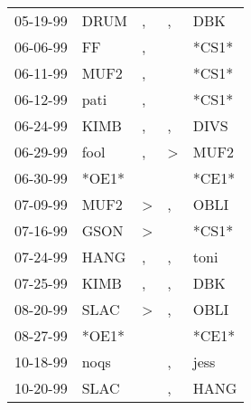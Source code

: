 \begin{supertabular}{p{0.07\textwidth}p{0.06\textwidth}p{0.02\textwidth}p{0.02\textwidth}p{0.06\textwidth}}
 05-19-99\textsuperscript{} &           DRUM\textsuperscript{} &             , &             , &   DBK\textsuperscript{} \\
 06-06-99\textsuperscript{} &             FF\textsuperscript{} &             , &               &                   *CS1* \\
 06-11-99\textsuperscript{} &           MUF2\textsuperscript{} &             , &               &                   *CS1* \\
 06-12-99\textsuperscript{} &           pati\textsuperscript{} &             , &               &                   *CS1* \\
 06-24-99\textsuperscript{} &           KIMB\textsuperscript{} &             , &             , &  DIVS\textsuperscript{} \\
 06-29-99\textsuperscript{} &           fool\textsuperscript{} &             , &  \textgreater &  MUF2\textsuperscript{} \\
 06-30-99\textsuperscript{} &                            *OE1* &               &               &                   *CE1* \\
 07-09-99\textsuperscript{} &           MUF2\textsuperscript{} &  \textgreater &             , &  OBLI\textsuperscript{} \\
 07-16-99\textsuperscript{} &           GSON\textsuperscript{} &  \textgreater &               &                   *CS1* \\
 07-24-99\textsuperscript{} &           HANG\textsuperscript{} &             , &             , &  toni\textsuperscript{} \\
 07-25-99\textsuperscript{} &           KIMB\textsuperscript{} &             , &             , &   DBK\textsuperscript{} \\
 08-20-99\textsuperscript{} &           SLAC\textsuperscript{} &  \textgreater &             , &  OBLI\textsuperscript{} \\
 08-27-99\textsuperscript{} &                            *OE1* &               &               &                   *CE1* \\
 10-18-99\textsuperscript{} &           noqs\textsuperscript{} &               &             , &  jess\textsuperscript{} \\
 10-20-99\textsuperscript{} &           SLAC\textsuperscript{} &               &             , &  HANG\textsuperscript{} \\

\end{supertabular}
